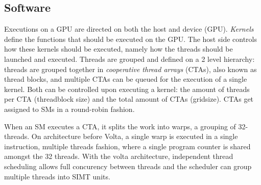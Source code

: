 
\subsection{Software}
Executions on a GPU are directed on both the host and device (GPU).
\textit{Kernels} define the functions that should be executed on the GPU.
The host side controls how these kernels should be executed, namely how the threads should be launched and executed.
Threads are grouped and defined on a 2 level hierarchy: threads are grouped together in \textit{cooperative thread arrays} (CTAs), also known as thread blocks, and multiple CTAs can be queued for the execution of a single kernel.
Both can be controlled upon executing a kernel: the amount of threads per CTA (threadblock size) and the total amount of CTAs (gridsize).
CTAs get assigned to SMs in a round-robin fashion.

When an SM executes a CTA, it splits the work into warps, a grouping of 32-threads.
On architecture before Volta, a single warp is executed in a single instruction, multiple threads fashion, where a single program counter is shared amongst the 32 threads.
With the volta architecture, independent thread scheduling allows full concurency between threads and the scheduler can group multiple threads into SIMT units.



\begin{figure}[!hb]
    \centering
    \caption{
    }
\end{figure}


\begin{figure}[!hb]
    \centering
    \caption{
    }
\end{figure}

